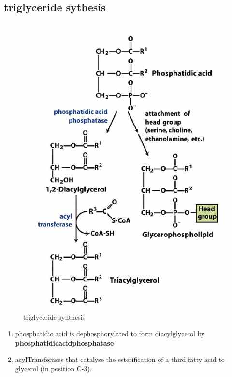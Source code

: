 \documentclass[../main.tex]{subfiles}
\begin{document}
\subsection{triglyceride sythesis}
\begin{figure}[H]
    \centering
    \includegraphics[width=0.4\linewidth]{TAG_syth.png}
    \caption{triglyceride synthesis}
    \label{fig:enter-label}
\end{figure}
\begin{enumerate}
    \item phosphatidic acid is dephosphorylated to form diacylglycerol by \textbf{\gls{phosphatidicacidphosphatase}}
    
    \item \gls{acylTransferases} that catalyse the esterification of a third fatty acid to glycerol (in position C-3).
\end{enumerate}
\end{document}
